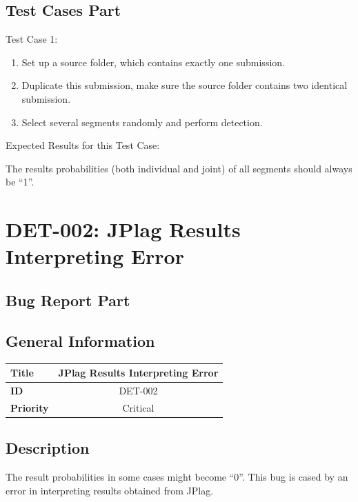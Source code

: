 \documentclass[twoside,a4paper]{refart}
\newcommand{\bugsecond}{DET-002: JPlag Results Interpreting Error}
\begin{document}
\subsection{Test Cases Part}
Test Case 1:

\begin{enumerate}
\item Set up a source folder, which contains exactly one submission.
\item Duplicate this submission, make sure the source folder contains two identical submission.
\item Select several segments randomly and perform detection.
\end{enumerate}
Expected Results for this Test Case: 

The results probabilities (both individual and joint) of all segments should always be \enquote{1}.

\section{\bugsecond} \label{sec:step}
\subsection{Bug Report Part}

\subsection*{General Information}
\begin{table}[!h]
\begin{tabular}{|l|c|}
\hline
\textbf{Title} & JPlag Results Interpreting Error \\ \hline
\textbf{ID} & DET-002 \\ \hline
\textbf{Priority} & Critical \\ \hline
\end{tabular}
\end{table}

\subsection*{Description}
The result probabilities in some cases might become \enquote{0}. This bug is cased by an error in interpreting results obtained from JPlag.
\end{document}
